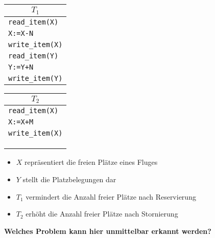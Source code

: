 \begin{frame}{\insertsection}
\framesubtitle{\insertsubsection}
\begin{center}
	\begin{tabular}{|p{3.5cm}|}
		\multicolumn{1}{c}{$T_1$} \\\hline
		\texttt{read\_item(X)} \\
		\texttt{X:=X-N} \\
		\texttt{write\_item(X)}\\
		\texttt{read\_item(Y)}  \\
		\texttt{Y:=Y+N} \\
		\texttt{write\_item(Y)}\\\hline
	\end{tabular}
	\hspace{0.5cm}
	\begin{tabular}{|p{3.5cm}|}
		\multicolumn{1}{c}{$T_2$} \\\hline
		\texttt{read\_item(X)}\\
		\texttt{X:=X+M}\\
		\texttt{write\_item(X)}\\
		\\
		\\
		\\\hline
	\end{tabular}
\end{center}
\begin{itemize}
	\item $X$ repr\"asentiert die freien Pl\"atze eines Fluges 
	\item $Y$ stellt die Platzbelegungen dar
	\item $T_1$ vermindert die Anzahl freier Pl\"atze nach Reservierung
	\item $T_2$ erh\"oht die Anzahl freier Pl\"atze nach Stornierung
\end{itemize}
\pause
\textbf{Welches Problem kann hier unmittelbar erkannt werden?}
\end{frame}


